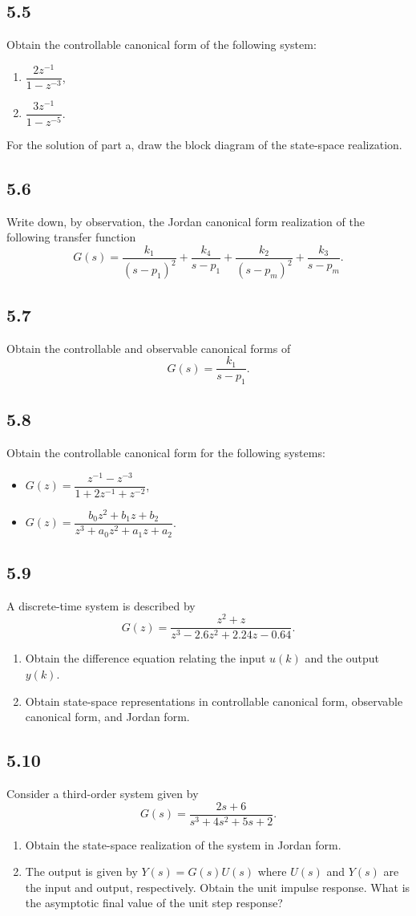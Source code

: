 \documentclass{article}
\newcommand{\problem}[2]{\subsection*{#1}}
\begin{document}
\problem{5.5}{canonical-form-drills}
Obtain the controllable canonical form of the following system:
\begin{enumerate}
\item $\dfrac{2z^{-1}}{1 - z^{-3}}$,
\item $\dfrac{3z^{-1}}{1 - z^{-5}}$.
\end{enumerate}
For the solution of part a, draw the block diagram of the state-space realization.

\problem{5.6}{jordan-form-drills}
Write down, by observation, the Jordan canonical form realization of the following transfer function
\[
G(s) = \frac{k_1}{(s - p_1)^2} + \frac{k_4}{s - p_1} + \frac{k_2}{(s - p_m)^2} + \frac{k_3}{s - p_m}.
\]

\problem{5.7}{canonical-form-drills}
Obtain the controllable and observable canonical forms of
\[
G(s) = \frac{k_1}{s - p_1}.
\]

\problem{5.8}{canonical-form-drills}
Obtain the controllable canonical form for the following systems:
\begin{itemize}
\item $G(z) = \dfrac{z^{-1} - z^{-3}}{1 + 2z^{-1} + z^{-2}}$,
\item $G(z) = \dfrac{b_0 z^2 + b_1 z + b_2}{z^3 + a_0 z^2 + a_1 z + a_2}$.
\end{itemize}

\problem{5.9}{}
A discrete-time system is described by
\[
G(z) = \frac{z^2 + z}{z^3 - 2.6z^2 + 2.24z - 0.64}.
\]
\begin{enumerate}
\item Obtain the difference equation relating the input $u(k)$ and the output $y(k)$.
\item Obtain state-space representations in controllable canonical form, observable canonical form, and Jordan form.
\end{enumerate}

\problem{5.10}{}
Consider a third-order system given by
\[
G(s) = \frac{2s + 6}{s^3 + 4s^2 + 5s + 2}.
\]
\begin{enumerate}
\item Obtain the state-space realization of the system in Jordan form.
\item The output is given by $Y(s) = G(s)U(s)$ where $U(s)$ and $Y(s)$ are the input and output, respectively. Obtain the unit impulse response. What is the asymptotic final value of the unit step response?
\end{enumerate}
\end{document}
